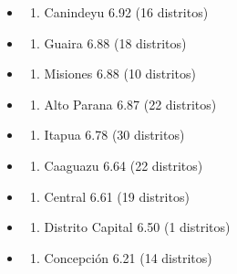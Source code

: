 \begin{itemize}
  \begin{enumerate}
  \def\labelenumi{\arabic{enumi}.}
  \setcounter{enumi}{8}
  \tightlist
  \item
    Boqueron 6.93 (4 distritos)
  \end{enumerate}
\item
  \begin{enumerate}
  \def\labelenumi{\arabic{enumi}.}
  \setcounter{enumi}{9}
  \tightlist
  \item
    Canindeyu 6.92 (16 distritos)
  \end{enumerate}
\item
  \begin{enumerate}
  \def\labelenumi{\arabic{enumi}.}
  \setcounter{enumi}{10}
  \tightlist
  \item
    Guaira 6.88 (18 distritos)
  \end{enumerate}
\item
  \begin{enumerate}
  \def\labelenumi{\arabic{enumi}.}
  \setcounter{enumi}{11}
  \tightlist
  \item
    Misiones 6.88 (10 distritos)
  \end{enumerate}
\item
  \begin{enumerate}
  \def\labelenumi{\arabic{enumi}.}
  \setcounter{enumi}{12}
  \tightlist
  \item
    Alto Parana 6.87 (22 distritos)
  \end{enumerate}
\item
  \begin{enumerate}
  \def\labelenumi{\arabic{enumi}.}
  \setcounter{enumi}{13}
  \tightlist
  \item
    Itapua 6.78 (30 distritos)
  \end{enumerate}
\item
  \begin{enumerate}
  \def\labelenumi{\arabic{enumi}.}
  \setcounter{enumi}{14}
  \tightlist
  \item
    Caaguazu 6.64 (22 distritos)
  \end{enumerate}
\item
  \begin{enumerate}
  \def\labelenumi{\arabic{enumi}.}
  \setcounter{enumi}{15}
  \tightlist
  \item
    Central 6.61 (19 distritos)
  \end{enumerate}
\item
  \begin{enumerate}
  \def\labelenumi{\arabic{enumi}.}
  \setcounter{enumi}{16}
  \tightlist
  \item
    Distrito Capital 6.50 (1 distritos)
  \end{enumerate}
\item
  \begin{enumerate}
  \def\labelenumi{\arabic{enumi}.}
  \setcounter{enumi}{17}
  \tightlist
  \item
    Concepción 6.21 (14 distritos)
  \end{enumerate}
\end{itemize}

